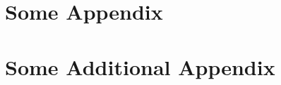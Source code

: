 \documentclass{thesis}
\begin{document}
\begin{appendices}
    \chapter{Some Appendix}\label{app:a}
    
    \chapter{Some Additional Appendix}\label{app:b}
    
\end{appendices}
\end{document}
